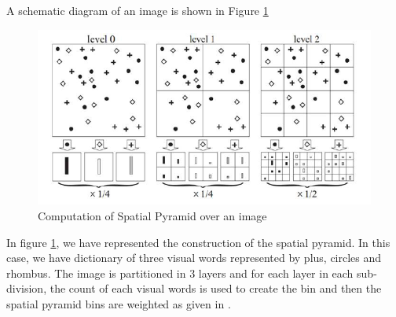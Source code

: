    A schematic diagram of  an image is shown in Figure \ref{fig:pyramidCompute}
 \begin{center}
\begin{figure}
\centering
\includegraphics[width=\linewidth]{./Pictures/SIFT/pyramidCompute.jpg}
\caption{Computation of Spatial Pyramid over an image }
\label{fig:pyramidCompute}
\end{figure}
\end{center}
    In figure \ref{fig:pyramidCompute}, we have represented the construction of the spatial pyramid. In this case, we have dictionary of three visual words represented by plus, circles and rhombus. The image is partitioned in 3 layers and for each layer in each sub-division, the count of each visual words is used to create the bin and then the spatial pyramid bins are weighted as given in \cite{bagOfWords}.
